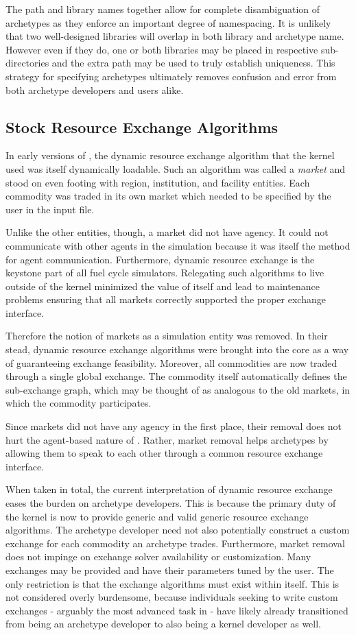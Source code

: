 The path and library names together allow for complete disambiguation of 
archetypes as they enforce an important degree of namespacing.  It is unlikely
that two well-designed libraries will overlap in both library and archetype name.
However even if they do, one or both libraries may be placed in respective
sub-directories and the extra path may be used to truly establish uniqueness.
This strategy for specifying archetypes ultimately removes confusion and error from 
both archetype developers and users alike.

\subsection{Stock Resource Exchange Algorithms}

In early versions of \cyclus, the dynamic resource exchange algorithm that the 
kernel used was itself dynamically loadable. Such an algorithm was called a
\emph{market} and stood on even footing with region, institution, and facility 
entities. Each commodity was traded in its own market which needed to be specified by 
the user in the input file.

Unlike the other entities, though, a market did not have agency.  It could not 
communicate with other agents in the simulation because it was itself the method
for agent communication.  Furthermore, dynamic resource exchange is the keystone
part of all fuel cycle simulators.  Relegating such algorithms to live outside of 
the kernel minimized the value of \cyclus itself and lead to maintenance problems 
ensuring that all markets correctly supported the proper exchange interface.

Therefore the notion of markets as a simulation entity was removed. In their 
stead, dynamic resource exchange algorithms were brought into the core as a way 
of guaranteeing exchange feasibility. Moreover, all commodities are now traded 
through a single global exchange. The commodity itself automatically defines 
the sub-exchange graph, which may be thought of as analogous to the old 
markets, in which the commodity participates.

Since markets did not have any agency in the first place, their removal does not 
hurt the agent-based
nature of \cyclus.  Rather, market removal helps archetypes by allowing them to 
speak to each other through a common resource exchange interface.

When taken in total, the current interpretation of dynamic resource exchange 
eases the burden on archetype developers. This is because the primary duty of the 
kernel is now to provide generic and valid generic resource exchange algorithms.
The archetype developer need not also potentially construct a custom exchange for 
each commodity an archetype trades. Furthermore, market removal does not 
impinge on exchange solver availability or customization.  Many exchanges may 
be provided and have their parameters tuned by the user.  The only restriction 
is that the exchange algorithms must exist within \cyclus itself.  This is not 
considered overly burdensome, because individuals seeking to write custom 
exchanges - arguably the most advanced task in \cyclus - have likely already 
transitioned from being an archetype developer to also being a kernel developer
as well.
